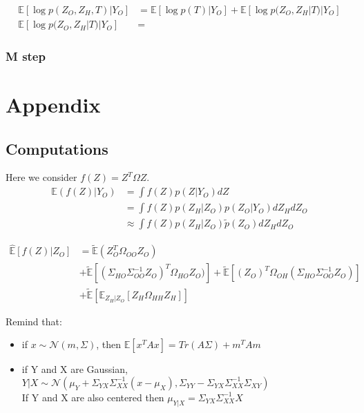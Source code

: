 \documentclass[11pt,a4paper]{article}
\newcommand{\Esp}{\mathds{E}}
\begin{document}
\begin{align*}
 \Esp[\log p(Z_O,Z_H,T) | Y_O ] &=  \Esp[\log p(T)|Y_O] +  \Esp[\log p(Z_O,Z_H|T)|Y_O] \\
  \Esp[\log p(Z_O,Z_H|T)|Y_O] &=
\end{align*} 

\subsubsection{M step}

\section{Appendix}
\subsection{Computations}

 Here we consider $f(Z) = Z^T\Omega Z$.
\begin{align*}
\Esp(f(Z)|Y_O) &=\int f(Z) p(Z|Y_O) dZ\\
&=\int f(Z) p(Z_H|Z_O) p(Z_O|Y_O) dZ_H dZ_O\\
&\approx \int f(Z) p(Z_H|Z_O)\tilde{p}(Z_O) dZ_H dZ_O
\end{align*}

\begin{align*}
\widehat{\Esp}[f(Z)|Z_O] &= \tilde{\Esp}(Z_O^T\Omega_{OO}Z_O)\\
& +\tilde{\Esp}\left[(\Sigma_{HO}\Sigma_{OO}^{-1} Z_O)^T \Omega_{HO}Z_O)\right] +\tilde{\Esp}\left[(Z_O)^T \Omega_{OH} (\Sigma_{HO}\Sigma_{OO}^{-1} Z_O)\right]\\
&+ \tilde{\Esp}\left[\Esp_{Z_H|Z_O} [Z_H\Omega_{HH}Z_H]\right]
\end{align*}


\vspace{2cm}
Remind that:
\begin{itemize}
\item if $x\sim\mathcal{N}(m, \Sigma)$, then
$\Esp[x^TAx] = Tr(A\Sigma) + m^TAm$
\item if Y and X are Gaussian, $Y|X \sim \mathcal{N}(\mu_Y+\Sigma_{YX}\Sigma_{XX}^{-1}(x-\mu_X) , \Sigma_{YY} - \Sigma_{YX}\Sigma_{XX}^{-1}\Sigma_{XY})$\\
If Y and X are also centered then $\mu_{Y|X} = \Sigma_{YX}\Sigma_{XX}^{-1} X$
\end{itemize}
\end{document}
